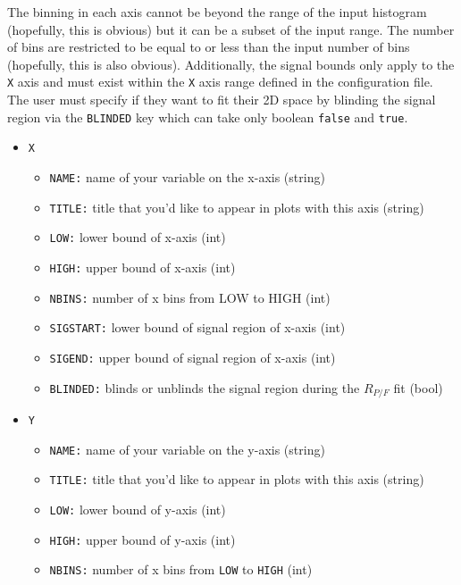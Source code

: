 \documentclass[letter]{article}
\begin{document}
            The binning in each axis cannot be beyond the range of the input histogram (hopefully, this is obvious) but it can be a subset of the input range. The number of bins are restricted to be equal to or less than the input number of bins (hopefully, this is also obvious). Additionally, the signal bounds only apply to the \verb"X" axis and must exist within the \verb"X" axis range defined in the configuration file. The user must specify if they want to fit their 2D space by blinding the signal region via the \verb"BLINDED" key which can take only boolean \verb"false" and \verb"true". 
            \begin{itemize}
                \item \verb"X"
                \begin{itemize}
                    \item \verb"NAME:" name of your variable on the x-axis (string)
                    \item \verb"TITLE:" title that you'd like to appear in plots with this axis (string)
                    \item \verb"LOW:" lower bound of x-axis (int)
                    \item \verb"HIGH:" upper bound of x-axis (int)
                    \item \verb"NBINS:" number of x bins from LOW to HIGH (int)
                    \item \verb"SIGSTART:" lower bound of signal region of x-axis (int)
                    \item \verb"SIGEND:" upper bound of signal region of x-axis (int)
                    \item \verb"BLINDED:" blinds or unblinds the signal region during the $R_{P/F}$ fit (bool)
                \end{itemize}
                \item \verb"Y"
                \begin{itemize}
                    \item \verb"NAME:" name of your variable on the y-axis (string)
                    \item \verb"TITLE:" title that you'd like to appear in plots with this axis (string)
                    \item \verb"LOW:" lower bound of y-axis (int)
                    \item \verb"HIGH:" upper bound of y-axis (int)
                    \item \verb"NBINS:" number of x bins from \verb"LOW" to \verb"HIGH" (int)
                \end{itemize}
            \end{itemize}
\end{document}
